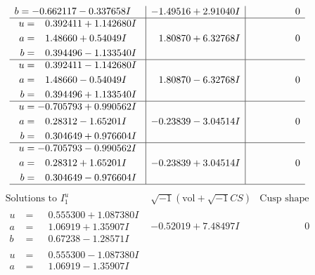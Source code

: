\documentclass[1p]{elsarticle_modified}
\theoremstyle{definition}
\newcommand{\I}{\sqrt{-1}}
\begin{document}
$$\begin{array}{c|c|c}
\begin{aligned}
b &= -0.662117 - 0.337658 I\end{aligned}
 & -1.49516 + 2.91040 I & \phantom{-0.000000 } 0 \\ \hline\begin{aligned}
u &= \phantom{-}0.392411 + 1.142680 I \\
a &= \phantom{-}1.48660 + 0.54049 I \\
b &= \phantom{-}0.394496 - 1.133540 I\end{aligned}
 & \phantom{-}1.80870 + 6.32768 I & \phantom{-0.000000 } 0 \\ \hline\begin{aligned}
u &= \phantom{-}0.392411 - 1.142680 I \\
a &= \phantom{-}1.48660 - 0.54049 I \\
b &= \phantom{-}0.394496 + 1.133540 I\end{aligned}
 & \phantom{-}1.80870 - 6.32768 I & \phantom{-0.000000 } 0 \\ \hline\begin{aligned}
u &= -0.705793 + 0.990562 I \\
a &= \phantom{-}0.28312 - 1.65201 I \\
b &= \phantom{-}0.304649 + 0.976604 I\end{aligned}
 & -0.23839 - 3.04514 I & \phantom{-0.000000 } 0 \\ \hline\begin{aligned}
u &= -0.705793 - 0.990562 I \\
a &= \phantom{-}0.28312 + 1.65201 I \\
b &= \phantom{-}0.304649 - 0.976604 I\end{aligned}
 & -0.23839 + 3.04514 I & \phantom{-0.000000 } 0\\
 \hline 
 \end{array}$$\newpage$$\begin{array}{c|c|c}  
\text{Solutions to }I^u_{1}& \I (\text{vol} + \sqrt{-1}CS) & \text{Cusp shape}\\
 \hline 
\begin{aligned}
u &= \phantom{-}0.555300 + 1.087380 I \\
a &= \phantom{-}1.06919 + 1.35907 I \\
b &= \phantom{-}0.67238 - 1.28571 I\end{aligned}
 & -0.52019 + 7.48497 I & \phantom{-0.000000 } 0 \\ \hline\begin{aligned}
u &= \phantom{-}0.555300 - 1.087380 I \\
a &= \phantom{-}1.06919 - 1.35907 I \\

\end{aligned}
\end{array}$$
\end{document}
